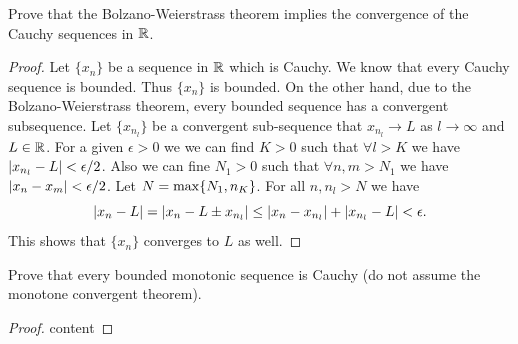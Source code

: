 \begin{problem}
	Prove that the Bolzano-Weierstrass theorem implies the convergence of the Cauchy sequences in $\mathbb{R}$.
\end{problem}

\begin{proof}
	Let $\{x_n\}$ be a sequence in $\mathbb{R}$ which is Cauchy. We know that every Cauchy sequence is bounded. Thus $\{x_n\}$ is bounded. On the other hand, due to the Bolzano-Weierstrass theorem, every bounded sequence has a convergent subsequence. Let $\{x_{n_l}\}$ be a convergent sub-sequence that $x_{n_l} \to L$ as $l \to \infty$ and $L \in \mathbb{R}$. For a given $\epsilon>0$ we we can find $K >0$ such that $\forall l > K$ we have $|x_{n_l} - L| < \epsilon/2$. Also we can fine $N_1>0$ such that $\forall n,m > N_1$ we have $|x_n - x_m| < \epsilon/2$. Let $N = \max\{N_1, n_K\}$. For all $n, n_l > N$ we have
	\[ |x_n - L| = |x_n - L \pm x_{n_l}| \leq |x_n - x_{n_l}| + |x_{n_l} - L| < \epsilon. \]
	This shows that $\{x_n\}$ converges to $L$ as well.
\end{proof}

\begin{problem}
	Prove that every bounded monotonic sequence is Cauchy (do not assume the monotone convergent theorem).
\end{problem}
\begin{proof}
	content
\end{proof}

